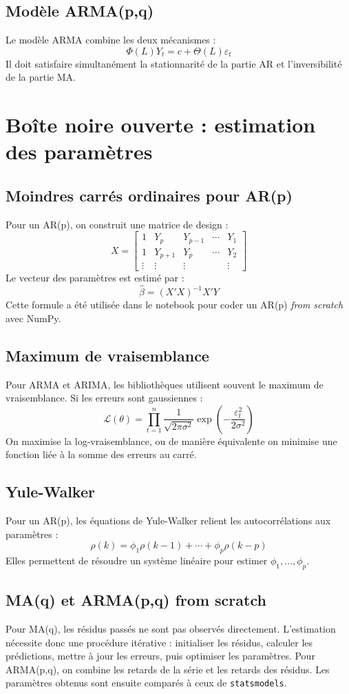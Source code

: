 \documentclass[12pt,a4paper]{report}
\begin{document}
\subsection{Modèle ARMA(p,q)}
Le modèle ARMA combine les deux mécanismes :
\[
\Phi(L)Y_t = c + \Theta(L)\varepsilon_t
\]
Il doit satisfaire simultanément la stationnarité de la partie AR et l'inversibilité de la partie MA.

\section{Boîte noire ouverte : estimation des paramètres}
\subsection{Moindres carrés ordinaires pour AR(p)}
Pour un AR(p), on construit une matrice de design :
\[
X = \begin{bmatrix}
1 & Y_p & Y_{p-1} & \cdots & Y_1 \\
1 & Y_{p+1} & Y_p & \cdots & Y_2 \\
\vdots & \vdots & \vdots & & \vdots
\end{bmatrix}
\]
Le vecteur des paramètres est estimé par :
\[
\hat{\beta} = (X'X)^{-1}X'Y
\]
Cette formule a été utilisée dans le notebook pour coder un AR(p) \textit{from scratch} avec NumPy.

\subsection{Maximum de vraisemblance}
Pour ARMA et ARIMA, les bibliothèques utilisent souvent le maximum de vraisemblance. Si les erreurs sont gaussiennes :
\[
\mathcal{L}(\theta) = \prod_{t=1}^n \frac{1}{\sqrt{2\pi\sigma^2}}\exp\left(-\frac{\varepsilon_t^2}{2\sigma^2}\right)
\]
On maximise la log-vraisemblance, ou de manière équivalente on minimise une fonction liée à la somme des erreurs au carré.

\subsection{Yule-Walker}
Pour un AR(p), les équations de Yule-Walker relient les autocorrélations aux paramètres :
\[
\rho(k) = \phi_1\rho(k-1)+\cdots+\phi_p\rho(k-p)
\]
Elles permettent de résoudre un système linéaire pour estimer $\phi_1, \ldots, \phi_p$.

\subsection{MA(q) et ARMA(p,q) from scratch}
Pour MA(q), les résidus passés ne sont pas observés directement. L'estimation nécessite donc une procédure itérative : initialiser les résidus, calculer les prédictions, mettre à jour les erreurs, puis optimiser les paramètres. Pour ARMA(p,q), on combine les retards de la série et les retards des résidus. Les paramètres obtenus sont ensuite comparés à ceux de \texttt{statsmodels}.
\end{document}
